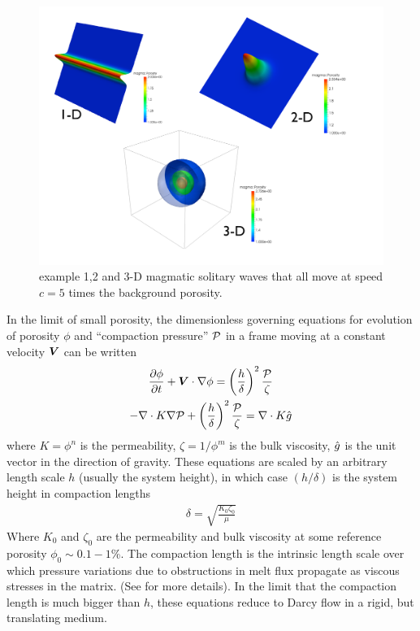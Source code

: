 \begin{figure}[htb!]
  \centering
  \includegraphics[width=.8\textwidth]{figures/CompositeSolitaryWaves.pdf} 
  \caption{example 1,2 and 3-D magmatic solitary waves that all move
    at speed $c=5$ times the background porosity.}
  \label{fig:SolitaryWavesAllD}
\end{figure}

In the limit of small porosity, the dimensionless governing equations for evolution
of porosity $\phi$ and ``compaction pressure'' $\mathcal{P}$ in a frame
moving at a constant velocity ${\mbox{\boldmath$V$}}$ can be written
\begin{gather}
  \frac{\partial\phi}{\partial t} + {\mbox{\boldmath$V$}}\cdot\nabla\phi = 
  \left(
    \frac{h}{\delta}
  \right)^{2}\frac{\mathcal{P}}{\zeta}  \label{eq:5.1}\\
-\nabla\cdot K \nabla\mathcal{P} + \left(
    \frac{h}{\delta}
  \right)^{2}\frac{\mathcal{P}}{\zeta} = \nabla\cdot K \hat{g}    \label{eq:5.2}
\end{gather}
where $K=\phi^{n}$ is the permeability, $\zeta = 1/\phi^{m}$ is the
bulk viscosity, $\hat{g}$ is the unit vector in the direction of
gravity.  These equations are scaled by an arbitrary length scale $h$
(usually the system height), in which case  $(h/\delta)$ is  the
system height  in compaction lengths
\begin{gather}
  \delta = \sqrt{\frac{K_{0}\zeta_0}{\mu}}
\end{gather}
Where $K_{0}$ and $\zeta_{0}$ are the permeability and bulk viscosity
at some reference porosity $\phi_{0}\sim0.1-1$\%.  
The compaction length is the intrinsic length scale over which
pressure variations due to obstructions in melt flux propagate as
viscous stresses in the matrix. (See
\cite{spiegelman_flow_1993,spiegelman_flow_1993-1} for more
details). In the limit that the compaction length is much bigger than $h$,
these equations reduce to Darcy flow in a rigid, but translating medium.

